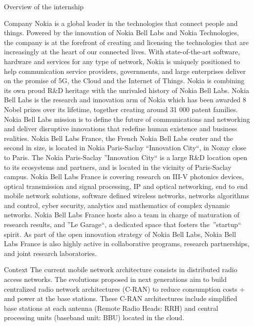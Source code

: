 \documentclass[a4paper,10pt]{report}
\begin{document}
\begin{chapter}{Overview of the internship}
\begin{section}{Company}
Nokia is a global leader in the technologies that connect people and things. Powered by the innovation of Nokia Bell Labs and Nokia Technologies, the company is at the forefront of creating and licensing the technologies that are increasingly at the heart of our connected lives. With state-of-the-art software, hardware and services for any type of network, Nokia is uniquely positioned to help communication service providers, governments, and large enterprises deliver on the promise of 5G, the Cloud and the Internet of Things. Nokia is combining its own proud R\&D heritage with the unrivaled history of Nokia Bell Labs. Nokia Bell Labs is the research and innovation arm of Nokia which has been awarded 8 Nobel prizes over its lifetime, together creating around 31 000 patent families. Nokia Bell Labs mission is to define the future of communications and networking and deliver disruptive innovations that redefine human existence and business realities.
Nokia Bell Labs France, the French Nokia Bell Labs center and the second in size, is located in Nokia Paris-Saclay ``Innovation City``, in Nozay close to Paris. The Nokia Paris-Saclay ''Innovation City`` is a large R\&D location open to its ecosystems and partners, and is located in the vicinity of Paris-Saclay campus. Nokia Bell Labs France is covering research on III-V photonics devices, optical transmission and signal processing, IP and optical networking, end to end mobile network solutions, software defined wireless networks, networks algorithms and control, cyber security, analytics and mathematics of complex dynamic networks. Nokia Bell Labs France hosts also a team in charge of maturation of research results, and ''Le Garage``, a dedicated space that fosters the ''startup`` spirit. As part of the open innovation strategy of Nokia Bell Labs, Nokia Bell Labs France is also highly active in collaborative programs, research partnerships, and joint research laboratories.
\end{section}
\begin{section}{Context}
The current mobile network architecture consists in distributed radio access networks.
The evolutions proposed in next generations aim to build centralized radio network architectures (C-RAN) to reduce consumption costs +
and power at the base stations. These C-RAN architectures include simplified base stations at each antenna (Remote Radio Heads: RRH) 
and central processing units (baseband unit: BBU) located in the cloud.\\



\end{section}
\end{chapter}
\end{document}
